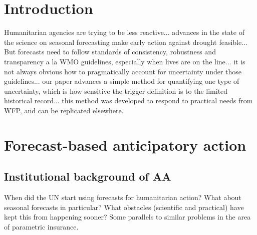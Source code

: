 \documentclass{ametsocV5}
\begin{document}




\section{Introduction}


Humanitarian agencies are trying to be less reactive... advances in the state of the science on seasonal forecasting make early action against drought feasible... But forecasts need to follow standards of consistency, robustness and transparency a la WMO guidelines, especially when lives are on the line... it is not always obvious how to pragmatically account for uncertainty under those guidelines... our paper advances a simple method for quantifying one type of uncertainty, which is how sensitive the trigger definition is to the limited historical record... this method was developed to respond to practical needs from WFP, and can be replicated elsewhere. 



\section{Forecast-based anticipatory action}

\subsection{Institutional background of AA}


When did the UN start using forecasts for humanitarian action? What about seasonal forecasts in particular? What obstacles (scientific and practical) have kept this from happening sooner? Some parallels to similar problems in the area of parametric insurance. 
\end{document}
